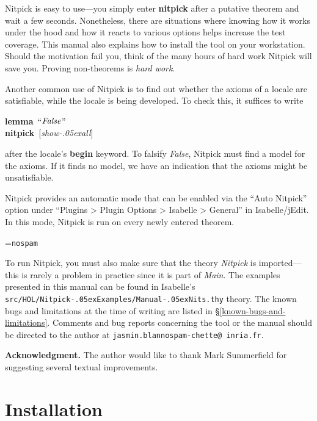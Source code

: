 \documentclass[a4paper,12pt]{article}
\renewcommand\_{\hbox{\textunderscore\kern-.05ex}}
\begin{document}
Nitpick is easy to use---you simply enter \textbf{nitpick} after a putative
theorem and wait a few seconds. Nonetheless, there are situations where knowing
how it works under the hood and how it reacts to various options helps
increase the test coverage. This manual also explains how to install the tool on
your workstation. Should the motivation fail you, think of the many hours of
hard work Nitpick will save you. Proving non-theorems is \textsl{hard work}.

Another common use of Nitpick is to find out whether the axioms of a locale are
satisfiable, while the locale is being developed. To check this, it suffices to
write

\prew
\textbf{lemma}~``$\textit{False\/}$'' \\
\textbf{nitpick}~[\textit{show\_all}]
\postw

after the locale's \textbf{begin} keyword. To falsify \textit{False}, Nitpick
must find a model for the axioms. If it finds no model, we have an indication
that the axioms might be unsatisfiable.

Nitpick provides an automatic mode that can be enabled via the ``Auto Nitpick''
option under ``Plugins > Plugin Options > Isabelle > General'' in
Isabelle/jEdit. In this mode, Nitpick is run on every newly entered theorem.

\newbox\boxA
\setbox\boxA=\hbox{\texttt{nospam}}

\newcommand\authoremail{\texttt{jasmin.blan{\color{white}nospam}\kern-\wd\boxA{}chette@\allowbreak
inria\allowbreak .\allowbreak fr}}

To run Nitpick, you must also make sure that the theory \textit{Nitpick} is
imported---this is rarely a problem in practice since it is part of
\textit{Main}. The examples presented in this manual can be found
in Isabelle's \texttt{src/HOL/\allowbreak Nitpick\_\allowbreak Examples/\allowbreak Manual\_Nits.thy} theory.
The known bugs and limitations at the time of writing are listed in
\S\ref{known-bugs-and-limitations}. Comments and bug reports concerning
the tool or the manual should be directed to the author at \authoremail.

\smallskipamount

\textbf{Acknowledgment.} The author would like to thank Mark Summerfield for
suggesting several textual improvements.

\section{Installation}
\label{installation}
\end{document}
